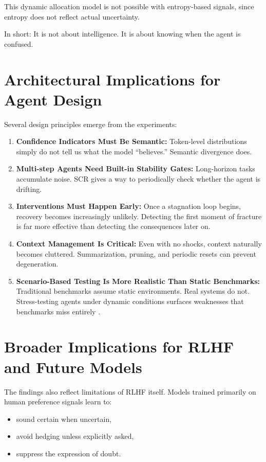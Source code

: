 \documentclass[12pt,a4paper]{report}
\begin{document}
This dynamic allocation model is not possible with entropy-based signals, since entropy does not reflect actual uncertainty.

In short: It is not about intelligence. It is about knowing when the agent is confused.

\section{Architectural Implications for Agent Design}
Several design principles emerge from the experiments:

\begin{enumerate}
    \item \textbf{Confidence Indicators Must Be Semantic:} Token-level distributions simply do not tell us what the model “believes.” Semantic divergence does.
    \item \textbf{Multi-step Agents Need Built-in Stability Gates:} Long-horizon tasks accumulate noise. SCR gives a way to periodically check whether the agent is drifting.
    \item \textbf{Interventions Must Happen Early:} Once a stagnation loop begins, recovery becomes increasingly unlikely. Detecting the first moment of fracture is far more effective than detecting the consequences later on.
    \item \textbf{Context Management Is Critical:} Even with no shocks, context naturally becomes cluttered. Summarization, pruning, and periodic resets can prevent degeneration.
    \item \textbf{Scenario-Based Testing Is More Realistic Than Static Benchmarks:} Traditional benchmarks assume static environments. Real systems do not. Stress-testing agents under dynamic conditions surfaces weaknesses that benchmarks miss entirely \cite{Jimenez2024SWEBenchPlus, Wang2025SavingSWE, Fu2024Tau, Zhou2024ToolSandbox, Grattafiori2025MCPMark}.
\end{enumerate}

\section{Broader Implications for RLHF and Future Models}
The findings also reflect limitations of RLHF itself. Models trained primarily on human preference signals learn to:
\begin{itemize}
    \item sound certain when uncertain,
    \item avoid hedging unless explicitly asked,
    \item suppress the expression of doubt.
\end{itemize}
\end{document}
